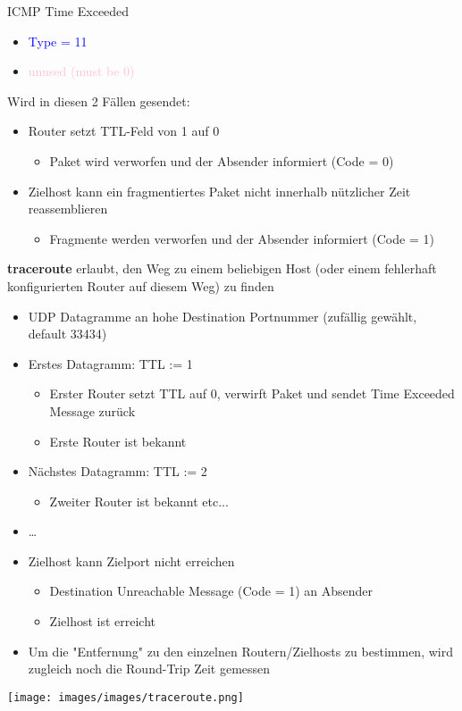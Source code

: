 \begin{definition}{ICMP Time Exceeded}
    \begin{itemize}
        \item \textcolor{blue}{Type = 11}
        \item \textcolor{pink}{unused (must be 0)}
    \end{itemize}
    Wird in diesen 2 Fällen gesendet:
    \begin{itemize}
        \item Router setzt TTL-Feld von 1 auf 0
        \begin{itemize}
            \item Paket wird verworfen und der Absender informiert (Code = 0)
        \end{itemize}
        \item Zielhost kann ein fragmentiertes Paket nicht innerhalb nützlicher Zeit reassemblieren
        \begin{itemize}
            \item Fragmente werden verworfen und der Absender informiert (Code = 1)
        \end{itemize}
    \end{itemize}
    \textbf{traceroute} erlaubt, den Weg zu einem beliebigen Host (oder einem fehlerhaft konfigurierten Router auf diesem Weg) zu finden
    \begin{itemize}
        \item UDP Datagramme an hohe Destination Portnummer (zufällig gewählt, default 33434)
        \item Erstes Datagramm: TTL := 1
        \begin{itemize}
            \item Erster Router setzt TTL auf 0, verwirft Paket und sendet Time Exceeded Message zurück
            \item Erste Router ist bekannt
        \end{itemize}
        \item Nächstes Datagramm: TTL := 2
        \begin{itemize}
            \item Zweiter Router ist bekannt etc...
        \end{itemize}
        \item …
        \item Zielhost kann Zielport nicht erreichen
        \begin{itemize}
            \item Destination Unreachable Message (Code = 1) an Absender
            \item Zielhost ist erreicht
        \end{itemize}
        \item Um die "Entfernung" zu den einzelnen Routern/Zielhosts zu bestimmen, wird zugleich noch die Round-Trip Zeit gemessen
    \end{itemize}
        \texttt{[image: images/images/traceroute.png]}
\end{definition}











